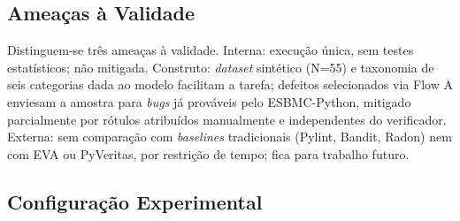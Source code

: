 \documentclass[sigconf]{acmart}
\begin{document}


\subsection{Ameaças à Validade}

Distinguem-se três ameaças à validade. Interna: execução única, sem testes estatísticos; não mitigada. Construto: \textit{dataset} sintético (N=55) e taxonomia de seis categorias dada ao modelo facilitam a tarefa; defeitos selecionados via Flow A enviesam a amostra para \textit{bugs} já prováveis pelo ESBMC-Python, mitigado parcialmente por rótulos atribuídos manualmente e independentes do verificador. Externa: sem comparação com \textit{baselines} tradicionais (Pylint, Bandit, Radon) nem com EVA ou PyVeritas, por restrição de tempo; fica para trabalho futuro.


\subsection{Configuração Experimental}
\end{document}
